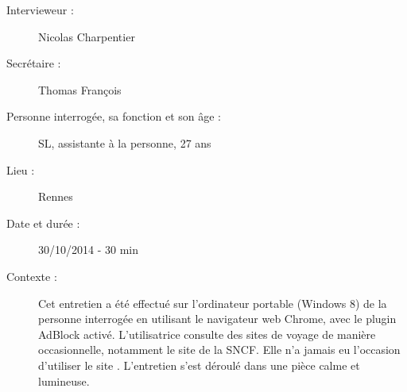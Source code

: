 \begin{description}
\item [Intervieweur :] Nicolas Charpentier
\item [Secr\'{e}taire :] Thomas Fran\c{c}ois
\item [Personne interrog\'{e}e, sa fonction et son \^{a}ge :] SL, assistante \`{a} la personne, 27 ans
\item [Lieu :] Rennes
\item [Date et dur\'{e}e :] 30/10/2014 - 30 min
\item [Contexte :] Cet entretien a \'{e}t\'{e} effectu\'{e} sur l'ordinateur portable (Windows 8) de la personne interrog\'{e}e en utilisant le navigateur web Chrome, avec le plugin AdBlock activ\'{e}. L'utilisatrice consulte des sites de voyage de mani\`{e}re occasionnelle, notamment le site de la SNCF. Elle n'a jamais eu l'occasion d'utiliser le site \kel. L'entretien s'est d\'{e}roul\'{e} dans une pi\`{e}ce calme et lumineuse. 
\end{description}


